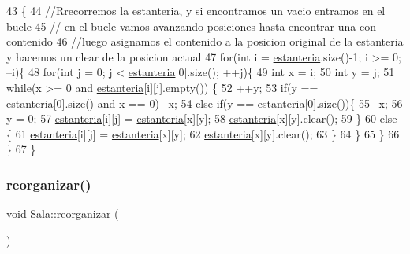 \begin{DoxyCode}
43                      \{
44     \textcolor{comment}{//Rrecorremos la estanteria, y si encontramos un vacio entramos en el bucle}
45     \textcolor{comment}{// en el bucle vamos avanzando posiciones hasta encontrar una con contenido}
46     \textcolor{comment}{//luego asignamos el contenido a la posicion original de la estanteria y hacemos un clear de la
       posicion actual}
47     \textcolor{keywordflow}{for}(\textcolor{keywordtype}{int} i = \mbox{\hyperlink{class_sala_a8f5264818c98db9c0d075c51a7672d95}{estanteria}}.size()-1; i >= 0; --i)\{
48         \textcolor{keywordflow}{for}(\textcolor{keywordtype}{int} j = 0; j < \mbox{\hyperlink{class_sala_a8f5264818c98db9c0d075c51a7672d95}{estanteria}}[0].size(); ++j)\{
49             \textcolor{keywordtype}{int} x = i;
50             \textcolor{keywordtype}{int} y = j;
51             \textcolor{keywordflow}{while}(x >= 0 and \mbox{\hyperlink{class_sala_a8f5264818c98db9c0d075c51a7672d95}{estanteria}}[i][j].empty()) \{
52                 ++y;
53                 \textcolor{keywordflow}{if}(y == \mbox{\hyperlink{class_sala_a8f5264818c98db9c0d075c51a7672d95}{estanteria}}[0].size() and x == 0) --x; 
54                 \textcolor{keywordflow}{else} \textcolor{keywordflow}{if}(y == \mbox{\hyperlink{class_sala_a8f5264818c98db9c0d075c51a7672d95}{estanteria}}[0].size())\{
55                     --x;
56                     y = 0;
57                     \mbox{\hyperlink{class_sala_a8f5264818c98db9c0d075c51a7672d95}{estanteria}}[i][j] = \mbox{\hyperlink{class_sala_a8f5264818c98db9c0d075c51a7672d95}{estanteria}}[x][y];
58                     \mbox{\hyperlink{class_sala_a8f5264818c98db9c0d075c51a7672d95}{estanteria}}[x][y].clear(); 
59                 \}
60                 \textcolor{keywordflow}{else} \{
61                     \mbox{\hyperlink{class_sala_a8f5264818c98db9c0d075c51a7672d95}{estanteria}}[i][j] = \mbox{\hyperlink{class_sala_a8f5264818c98db9c0d075c51a7672d95}{estanteria}}[x][y];
62                     \mbox{\hyperlink{class_sala_a8f5264818c98db9c0d075c51a7672d95}{estanteria}}[x][y].clear(); 
63                 \}
64             \}
65         \}
66     \}
67 \}
\end{DoxyCode}
\mbox{\label{class_sala_aaac8d848595b493ea08516f2101b829e}} 
\subsubsection{\texorpdfstring{reorganizar()}{reorganizar()}}
{\footnotesize\ttfamily void Sala\+::reorganizar (\begin{DoxyParamCaption}{ }\end{DoxyParamCaption})}



